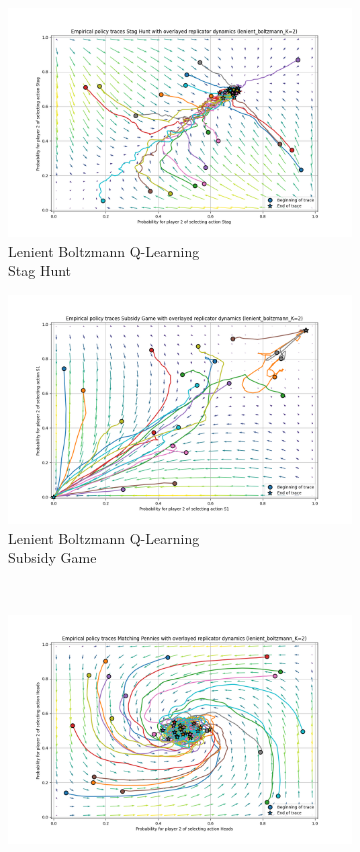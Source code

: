 \documentclass[12pt,letterpaper, onecolumn]{exam}
\begin{document}
\begin{figure}
    \begin{subfigure}{.5\textwidth}
      \centering
      \includegraphics[width=.6\linewidth]{plots/replicator_trajectoreis_Stag Hunt_lenient_boltzmann_K=2.png}
      \caption{Lenient Boltzmann Q-Learning\\ Stag Hunt}
      \label{fig:sfiglbsh}
    \end{subfigure}%
    \begin{subfigure}{.5\textwidth}
      \centering
      \includegraphics[width=.6\linewidth]{plots/replicator_trajectoreis_Subsidy Game_lenient_boltzmann_K=2.png}
      \caption{Lenient Boltzmann Q-Learning\\ Subsidy Game}
      \label{fig:sfiglbsg}
    \end{subfigure}\\
    \begin{subfigure}{.5\textwidth}
      \centering
      \includegraphics[width=.6\linewidth]{plots/replicator_trajectoreis_Matching Pennies_lenient_boltzmann_K=2.png}

\end{subfigure}
\end{figure}
\end{document}
